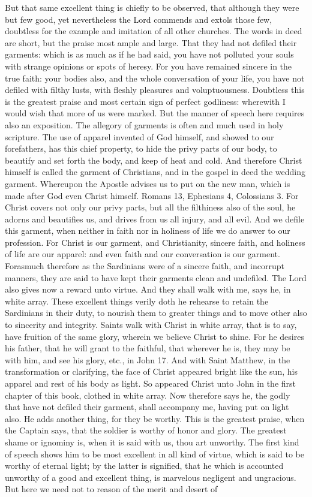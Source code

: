 But that same excellent thing is chiefly to be observed, that although they were but few good, yet nevertheless the Lord commends and extols those few, doubtless for the example and imitation of all other churches. The words in deed are short, but the praise most ample and large. That they had not defiled their garments: which is as much as if he had said, you have not polluted your souls with strange opinions or spots of heresy. For you have remained sincere in the true faith: your bodies also, and the whole conversation of your life, you have not defiled with filthy lusts, with fleshly pleasures and voluptuousness. Doubtless this is the greatest praise and most certain sign of perfect godliness: wherewith I would wish that more of us were marked. But the manner of speech here requires also an exposition. The allegory of garments is often and much used in holy scripture. The use of apparel invented of God himself, and showed to our forefathers, has this chief property, to hide the privy parts of our body, to beautify and set forth the body, and keep of heat and cold. And therefore Christ himself is called the garment of Christians, and in the gospel in deed the wedding garment. Whereupon the Apostle advises us to put on the new man, which is made after God even Christ himself. Romans 13, Ephesians 4, Colossians 3. For Christ covers not only our privy parts, but all the filthiness also of the soul, he adorns and beautifies us, and drives from us all injury, and all evil. And we defile this garment, when neither in faith nor in holiness of life we do answer to our profession. For Christ is our garment, and Christianity, sincere faith, and holiness of life are our apparel: and even faith and our conversation is our garment. Forasmuch therefore as the Sardinians were of a sincere faith, and incorrupt manners, they are said to have kept their garments clean and undefiled. The Lord also gives now a reward unto virtue. And they shall walk with me, says he, in white array. These excellent things verily doth he rehearse to retain the Sardinians in their duty, to nourish them to greater things and to move other also to sincerity and integrity. Saints walk with Christ in white array, that is to say, have fruition of the same glory, wherein we believe Christ to shine. For he desires his father, that he will grant to the faithful, that wherever he is, they may be with him, and see his glory, etc., in John 17. And with Saint Matthew, in the transformation or clarifying, the face of Christ appeared bright like the sun, his apparel and rest of his body as light. So appeared Christ unto John in the first chapter of this book, clothed in white array. Now therefore says he, the godly that have not defiled their garment, shall accompany me, having put on light also. He adds another thing, for they be worthy. This is the greatest praise, when the Captain says, that the soldier is worthy of honor and glory. The greatest shame or ignominy is, when it is said with us, thou art unworthy. The first kind of speech shows him to be most excellent in all kind of virtue, which is said to be worthy of eternal light; by the latter is signified, that he which is accounted unworthy of a good and excellent thing, is marvelous negligent and ungracious. But here we need not to reason of the merit and desert of 
